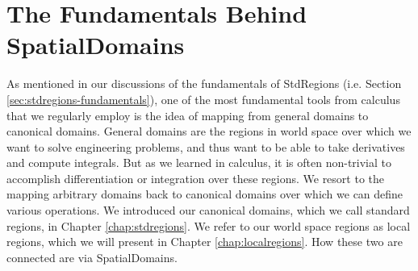 %
\section{The Fundamentals Behind SpatialDomains}
\label{sec:spatialdomains-fundamentals}

As mentioned in our discussions of the fundamentals of StdRegions (i.e. Section \ref{sec:stdregions-fundamentals}), one of the most
fundamental tools from calculus that we regularly employ is the idea of mapping from general domains to canonical domains.  General
domains are the regions in world space over which we want to solve engineering problems, and thus want to be able to take derivatives and
compute integrals.  But as we learned in calculus, it is often non-trivial to accomplish differentiation or integration over these regions.  We resort
to the mapping arbitrary domains back to canonical domains over which we can define various operations.  We introduced our canonical domains,
which we call standard regions, in Chapter \ref{chap:stdregions}.  We refer to our world space regions as local regions, which we will present
in Chapter \ref{chap:localregions}.  How these two are connected are via SpatialDomains.  

